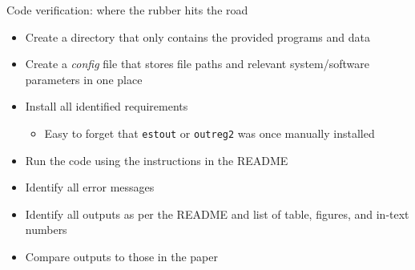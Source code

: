 \documentclass[xcolor={dvipsnames}]{beamer}
\theoremstyle{definition}
\begin{document}
\begin{frame}{Code verification: where the rubber hits the road}
\begin{itemize}
    \item Create a directory that only contains the provided programs and data
    \item Create a \textit{config} file that stores file paths and relevant system/software parameters in one place
    \item Install all identified requirements
    \begin{itemize}
        \item Easy to forget that \texttt{estout} or \texttt{outreg2} was once manually installed
    \end{itemize}
    \item Run the code using the instructions in the README
    \item Identify all error messages
    \item Identify all outputs as per the README and list of table, figures, and in-text numbers
    \item Compare outputs to those in the paper
\end{itemize}
\end{frame}
\end{document}
